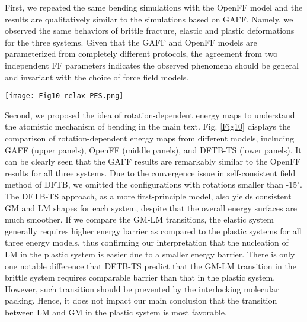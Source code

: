\documentclass[prb,superscriptaddress,longbibliography, twocolumn]{revtex4-1}
\begin{document}
First, we repeated the same bending simulations with the OpenFF model and the results are qualitatively similar to the simulations based on GAFF. Namely, we observed the same behaviors of brittle fracture, elastic and plastic deformations for the three systems. Given that the GAFF and OpenFF models are parameterized from completely different protocols, the agreement from two independent FF parameters indicates the observed phenomena should be general and invariant with the choice of force field models.

\begin{figure*}[htbp]
\centering
\vspace{-3mm}
\texttt{[image: Fig10-relax-PES.png]}
\vspace{-5mm}
\caption{\label{Fig10} The comparison of rotation-dependent energy maps from different models.}
\end{figure*}

Second, we proposed the idea of rotation-dependent energy maps to understand the atomistic mechanism of bending in the main text. Fig. \ref{Fig10} displays the comparison of rotation-dependent energy maps from different models, including GAFF (upper panels), OpenFF (middle panels), and DFTB-TS (lower panels). It can be clearly seen that the GAFF results are remarkably similar to the OpenFF results for all three systems. Due to the convergence issue in self-consistent field method of DFTB, we omitted the configurations with rotations smaller than -15$^\circ$. The DFTB-TS approach, as a more first-principle model, also yields consistent GM and LM shapes for each system, despite that the overall energy surfaces are much smoother. If we compare the GM-LM transitions, the elastic system generally requires higher energy barrier as compared to the plastic systems for all three energy models, thus confirming our interpretation that the nucleation of LM in the plastic system is easier due to a smaller energy barrier. There is only one notable difference that DFTB-TS predict that the GM-LM transition in the brittle system requires comparable barrier than that in the plastic system. However, such transition should be prevented by the interlocking molecular packing. Hence, it does not impact our main conclusion that the transition between LM and GM in the plastic system is most favorable. 


\end{document}
